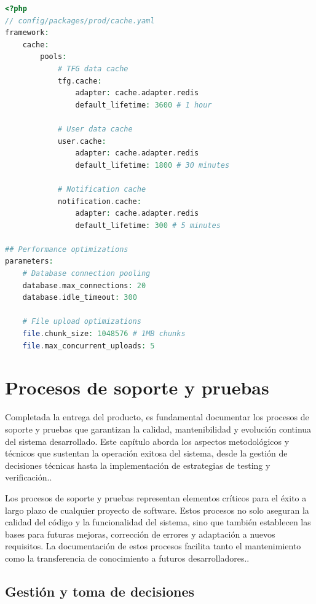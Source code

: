 \documentclass[12pt,a4paper,oneside]{report}
\begin{document}
\begin{lstlisting}[language=PHP]
<?php
// config/packages/prod/cache.yaml
framework:
    cache:
        pools:
            # TFG data cache
            tfg.cache:
                adapter: cache.adapter.redis
                default_lifetime: 3600 # 1 hour
                
            # User data cache  
            user.cache:
                adapter: cache.adapter.redis
                default_lifetime: 1800 # 30 minutes
                
            # Notification cache
            notification.cache:
                adapter: cache.adapter.redis
                default_lifetime: 300 # 5 minutes

## Performance optimizations
parameters:
    # Database connection pooling
    database.max_connections: 20
    database.idle_timeout: 300
    
    # File upload optimizations
    file.chunk_size: 1048576 # 1MB chunks
    file.max_concurrent_uploads: 5
\end{lstlisting}

\chapter{Procesos de soporte y
pruebas}\label{procesos-de-soporte-y-pruebas}

Completada la entrega del producto, es fundamental documentar los
procesos de soporte y pruebas que garantizan la calidad, mantenibilidad
y evolución continua del sistema desarrollado. Este capítulo aborda los
aspectos metodológicos y técnicos que sustentan la operación exitosa del
sistema, desde la gestión de decisiones técnicas hasta la implementación
de estrategias de testing y verificación..

Los procesos de soporte y pruebas representan elementos críticos para el
éxito a largo plazo de cualquier proyecto de software. Estos procesos no
solo aseguran la calidad del código y la funcionalidad del sistema, sino
que también establecen las bases para futuras mejoras, corrección de
errores y adaptación a nuevos requisitos. La documentación de estos
procesos facilita tanto el mantenimiento como la transferencia de
conocimiento a futuros desarrolladores..

\section{Gestión y toma de
decisiones}\label{gestiuxf3n-y-toma-de-decisiones}
\end{document}
